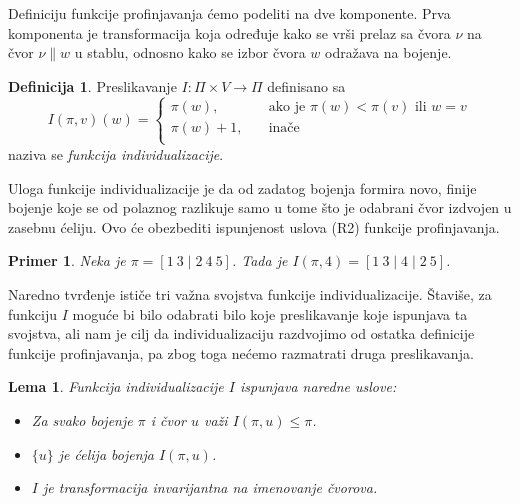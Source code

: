 \documentclass[12pt,oneside]{memoir}
\newtheorem{lemma}{Lema}
\newtheorem{example}{Primer}
\theoremstyle{definition}
\newtheorem*{definition}{Definicija}
\begin{document}
  Definiciju funkcije profinjavanja ćemo podeliti na dve komponente. Prva
  komponenta je transformacija koja određuje kako se vrši prelaz sa čvora $\nu$
  na čvor $\nu \| w$ u stablu, odnosno kako se izbor čvora $w$ odražava na
  bojenje.

  \begin{definition}
	  Preslikavanje $I : \Pi \times V \to \Pi$ definisano sa
	  $$
	  I(\pi, v)(w) =
	  \begin{cases}
		  \pi(w), & \quad \text{ako je } \pi(w) < \pi(v) \text{ ili } w = v \\
		  \pi(w) + 1, & \quad \text{inače}\\
	  \end{cases}
	  $$
	  naziva se \emph{funkcija individualizacije}.
  \end{definition}

  Uloga funkcije individualizacije je da od zadatog bojenja formira novo,
  finije bojenje koje se od polaznog razlikuje samo u tome što je odabrani čvor
  izdvojen u zasebnu ćeliju. Ovo će obezbediti ispunjenost uslova (R2) funkcije
  profinjavanja.

  \begin{example}
	  Neka je $\pi = [1\ 3 \mid 2\ 4\ 5]$. Tada je $I(\pi, 4) = [1\ 3 \mid 4
	  \mid 2\ 5]$.
  \end{example}

  Naredno tvrđenje ističe tri važna svojstva funkcije individualizacije.
  Štaviše, za funkciju $I$ moguće bi bilo odabrati bilo koje preslikavanje koje
  ispunjava ta svojstva, ali nam je cilj da individualizaciju razdvojimo od
  ostatka definicije funkcije profinjavanja, pa zbog toga nećemo razmatrati
  druga preslikavanja.
  
  \begin{lemma}
	  Funkcija individualizacije $I$ ispunjava naredne uslove:
	  \begin{itemize}
		  \item[(I1)] Za svako bojenje $\pi$ i čvor $u$ važi $I(\pi, u) \leq \pi$.
		  \item[(I2)] $\{u\}$ je ćelija bojenja $I(\pi, u)$.
		  \item[(I3)] $I$ je transformacija invarijantna na imenovanje čvorova.
	  \end{itemize}
  \end{lemma}
  
\end{document}
